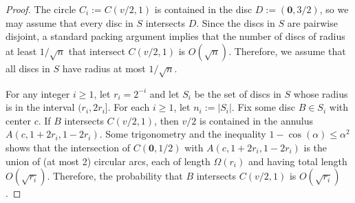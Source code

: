 \documentclass{patmorin}
\renewcommand{\ge}{\geqslant}
\renewcommand{\le}{\leqslant}
\begin{document}
\begin{proof}
  The circle $C_i:=C(v/2,1)$ is contained in the disc $D:=(\mathbf{0},3/2)$, so we may assume that every disc in $S$ intersects $D$.  Since the discs in $S$ are pairwise disjoint, a standard packing argument implies that the number of discs of radius at least $1/\sqrt{n}$ that intersect $C(v/2,1)$ is $O(\sqrt{n})$. Therefore, we assume that all discs in $S$ have radius at most $1/\sqrt{n}$.

  For any integer $i\ge 1$, let $r_i=2^{-i}$ and let $S_i$ be the set of discs in $S$ whose radius is in the interval $(r_i,2r_i]$. For each $i\ge 1$, let $n_i:=|S_i|$. Fix some disc $B\in S_i$ with center $c$.  If $B$ intersects $C(v/2,1)$, then $v/2$ is contained in the annulus $A(c,1+2r_i,1-2r_i)$.  Some trigonometry and the inequality $1-\cos(\alpha)\le \alpha^2$ shows that the intersection of $C(\mathbf{0},1/2)$ with $A(c,1+2r_i,1-2r_i)$ is the union of (at most 2) circular arcs, each of length $\Omega(r_i)$ and having total length  $O(\sqrt{r_i})$. Therefore, the probability that $B$ intersects $C(v/2,1)$ is $O(\sqrt{r_i})$.



\end{proof}
\end{document}
